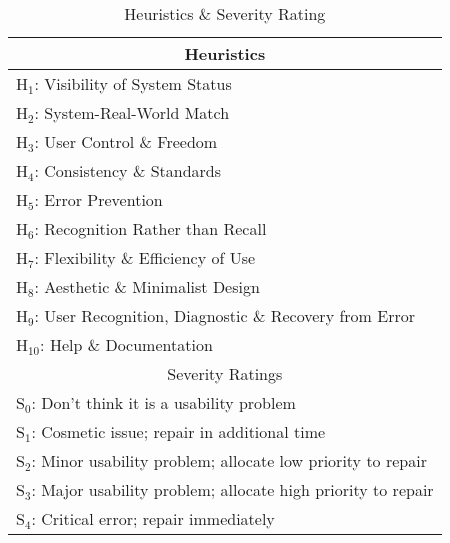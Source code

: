 \documentclass[11pt, english]{article}
\begin{document}
	\begin{table}[h]
                \scriptsize
                \renewcommand{\arraystretch}{1.25}
        \begin{center}
        \begin{tabular}{c}
                \hline
                Heuristics\\
                \hline
                \multicolumn{1}{l}{$\mathrm{H_{1}}$: Visibility of System Status}\\
                \multicolumn{1}{l}{$\mathrm{H_{2}}$: System-Real-World Match}\\
                \multicolumn{1}{l}{$\mathrm{H_{3}}$: User Control \& Freedom}\\
                \multicolumn{1}{l}{$\mathrm{H_{4}}$: Consistency \& Standards}\\
                \multicolumn{1}{l}{$\mathrm{H_{5}}$: Error Prevention}\\
                \multicolumn{1}{l}{$\mathrm{H_{6}}$: Recognition Rather than Recall}\\
                \multicolumn{1}{l}{$\mathrm{H_{7}}$: Flexibility \& Efficiency of Use}\\
                \multicolumn{1}{l}{$\mathrm{H_{8}}$: Aesthetic \& Minimalist Design}\\
                \multicolumn{1}{l}{$\mathrm{H_{9}}$: User Recognition, Diagnostic \& Recovery from Error}\\
                \multicolumn{1}{l}{$\mathrm{H_{10}}$: Help \& Documentation}\\
                \hline
                Severity Ratings\\
                \hline
                \multicolumn{1}{l}{$\mathrm{S_{0}}$: Don't think it is a usability problem}\\
                \multicolumn{1}{l}{$\mathrm{S_{1}}$: Cosmetic issue; repair in additional time}\\
                \multicolumn{1}{l}{$\mathrm{S_{2}}$: Minor usability problem; allocate low priority to repair}\\
                \multicolumn{1}{l}{$\mathrm{S_{3}}$: Major usability problem; allocate high priority to repair}\\
                \multicolumn{1}{l}{$\mathrm{S_{4}}$: Critical error; repair immediately}\\
                \hline
        \end{tabular}
                \caption{Heuristics \& Severity Rating}
        \end{center}
        \end{table}
\end{document}
